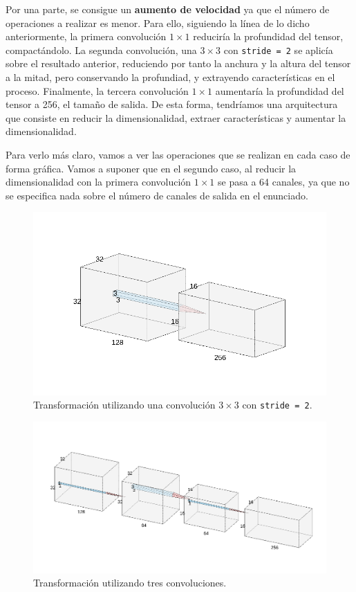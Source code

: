 \documentclass[11pt,a4paper]{article}
\begin{document}
Por una parte, se consigue un \textbf{aumento de velocidad} ya que el número de operaciones
a realizar es menor. Para ello, siguiendo la línea de lo dicho anteriormente,
la primera convolución $1 \times 1$ reduciría la profundidad del tensor, compactándolo.
La segunda convolución, una $3 \times 3$ con \texttt{stride = 2} se aplicía sobre el
resultado anterior, reduciendo por tanto la anchura y la altura del tensor a la mitad,
pero conservando la profundiad, y extrayendo características en el proceso. Finalmente,
la tercera convolución $1 \times 1$ aumentaría la profundidad del tensor a 256, el tamaño
de salida. De esta forma, tendríamos una arquitectura que consiste
en reducir la dimensionalidad, extraer características y aumentar la dimensionalidad.

Para verlo más claro, vamos a ver las operaciones que se realizan en cada caso
de forma gráfica. Vamos a suponer que en el segundo caso, al reducir la dimensionalidad
con la primera convolución $1 \times 1$ se pasa a 64 canales, ya que no se especifica
nada sobre el número de canales de salida en el enunciado.

\begin{figure}[H]
  \centering
  \includegraphics[scale=0.35]{img/cnn1.png}
  \caption{Transformación utilizando una convolución $3 \times 3$ con \texttt{stride = 2}.}
  \label{fig:cnn1}
\end{figure}

\begin{figure}[H]
  \centering
  \includegraphics[scale=0.3]{img/cnn2.png}
  \caption{Transformación utilizando tres convoluciones.}
  \label{fig:cnn2}
\end{figure}
\end{document}
